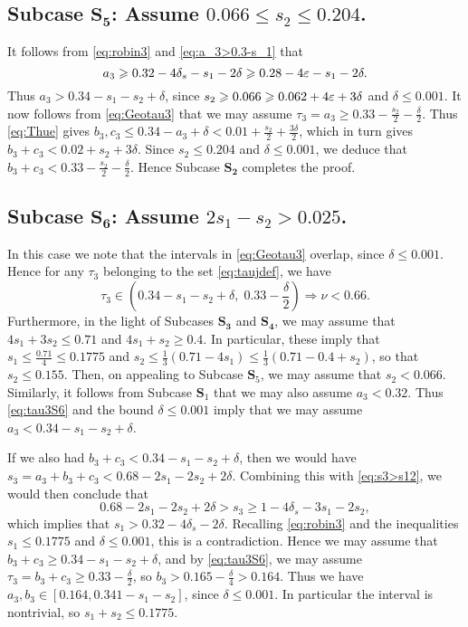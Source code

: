 \subsection*{Subcase $\mathbf{S_5}$: Assume $0.066\leq s_2\leq
0.204$.}

It follows from
\eqref{eq:robin3} and
 \eqref{eq:a_3>0.3-s_1} that
$$
a_3 \geqslant  0.32-4\delta_s-s_1 -2\delta \geqslant 0.28-4\varepsilon-s_1 -2\delta.
$$
Thus
$a_3>0.34-s_1-s_2 +\delta$, since $s_2\geqslant 0.066 \geqslant 0.062+4\varepsilon +3\delta$ and $\delta\leq 0.001$.
It now follows from  \eqref{eq:Geotau3} that we may assume $\tau_3=a_3 \geq  0.33
-\frac{s_2}{2}-
\frac{\delta}{2}$.
Thus
\eqref{eq:Thue} gives
$b_3,c_3 \le 0.34-a_3 +\delta< 0.01 +\frac{s_2}{2}+ \frac{3\delta}{2}$, which in turn gives
$b_3+c_3 < 0.02+s_2  +3\delta$.
Since $s_2\leq 0.204$ and $\delta\leq 0.001$, we deduce that
$b_3+c_3<0.33-\frac{s_2}{2}-\frac{\delta}{2}$. Hence
Subcase $\mathbf{S_2}$ completes the proof.


\subsection*{Subcase $\mathbf{S_6}$: Assume $2s_1-s_2>0.025$.}

In this case we note that the intervals in
\eqref{eq:Geotau3}  overlap, since $\delta\leq 0.001$.
Hence for any $\tau_3$ belonging to the set \eqref{eq:taujdef}, we have
\begin{equation}\label{eq:tau3S6}
\tau_3\in
 \left(0.34-s_1-s_2+ \delta, \;
 0.33-\frac{\delta}{2}\right)
 \Longrightarrow
\nu < 0.66.
\end{equation}
Furthermore,
in the light of Subcases $\mathbf{S_3}$ and $\mathbf{S_4}$, we may assume that
 $4s_1+3s_2\leq 0.71$ and $4s_1+s_2\geq 0.4$. In particular, these imply
 that $s_1\leq  \frac{0.71}{4}\leq 0.1775$ and
  $s_2 \leq  \frac{1}{3}(0.71 - 4s_1) \leq  \frac{1}{3}(0.71-0.4+s_2)$,  so that $s_2\leq 0.155$. Then, on appealing to Subcase
 $\mathbf{S}_5$, we  may assume that $s_2< 0.066$. Similarly, it follows from Subcase $\mathbf{S}_1$ that we may also assume $a_3<0.32$. Thus  \eqref{eq:tau3S6} and the bound $\delta\leq 0.001$ imply that we may assume $a_3< 0.34-s_1-s_2+ \delta$.

If we also had  $b_3+c_3<0.34-s_1-s_2+\delta$,  then we would have $s_3 = a_3 + b_3 +c_3 < 0.68-2s_1-2s_2+2\delta$. Combining this with
 \eqref{eq:s3>s12}, we would then conclude that
$$
0.68-2s_1-2s_2+2\delta>
s_3 \ge 1-4\delta_s-3s_1-2s_2,
$$
which implies that
$s_1>0.32-4\delta_s-2\delta$.
Recalling  \eqref{eq:robin3} and the inequalities
$s_1\leq 0.1775
 $ and $\delta\leq 0.001$, this is  a contradiction.
   Hence we may assume that  $b_3+c_3\ge 0.34-s_1-s_2+ \delta$, and by \eqref{eq:tau3S6}, we may assume $\tau_3=b_3+c_3\geq  0.33-\frac{\delta}{2}$, so $b_3>0.165-\frac{\delta}{4}> 0.164$. Thus we have $a_3,b_3\in [0.164, 0.341-s_1-s_2]$,
   since $\delta\leq 0.001$.
    In particular the interval is nontrivial, so $s_1+s_2\le 0.1775$.


